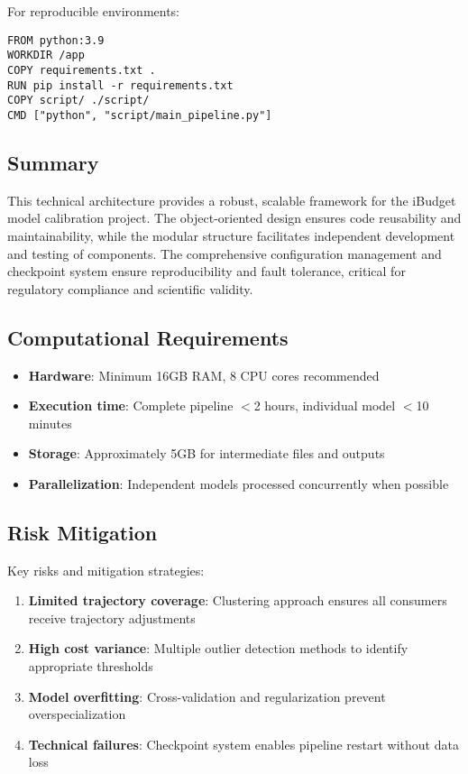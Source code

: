 For reproducible environments:

\begin{verbatim}
FROM python:3.9
WORKDIR /app
COPY requirements.txt .
RUN pip install -r requirements.txt
COPY script/ ./script/
CMD ["python", "script/main_pipeline.py"]
\end{verbatim}

\subsection{Summary}

This technical architecture provides a robust, scalable framework for the iBudget model calibration project. The object-oriented design ensures code reusability and maintainability, while the modular structure facilitates independent development and testing of components. The comprehensive configuration management and checkpoint system ensure reproducibility and fault tolerance, critical for regulatory compliance and scientific validity.

\subsection{Computational Requirements}

\begin{itemize}
    \item \textbf{Hardware}: Minimum 16GB RAM, 8 CPU cores recommended
    \item \textbf{Execution time}: Complete pipeline $<$2 hours, individual model $<$10 minutes
    \item \textbf{Storage}: Approximately 5GB for intermediate files and outputs
    \item \textbf{Parallelization}: Independent models processed concurrently when possible
\end{itemize}

\subsection{Risk Mitigation}

Key risks and mitigation strategies:
\begin{enumerate}
    \item \textbf{Limited trajectory coverage}: Clustering approach ensures all consumers receive trajectory adjustments
    \item \textbf{High cost variance}: Multiple outlier detection methods to identify appropriate thresholds
    \item \textbf{Model overfitting}: Cross-validation and regularization prevent overspecialization
    \item \textbf{Technical failures}: Checkpoint system enables pipeline restart without data loss
\end{enumerate}


